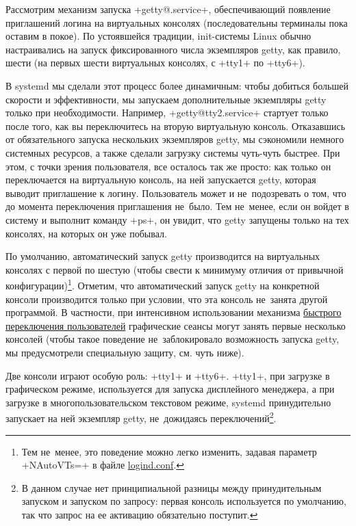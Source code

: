 \documentclass[10pt,oneside,a4paper]{article}
\begin{document}
Рассмотрим механизм запуска +getty@.service+, обеспечивающий появление
приглашений логина на виртуальных консолях (последовательны терминалы пока
оставим в покое). По устоявшейся традиции, init-системы Linux обычно
настраивались на запуск фиксированного числа экземпляров getty, как правило,
шести (на первых шести виртуальных консолях, с +tty1+ по +tty6+).

В systemd мы сделали этот процесс более динамичным: чтобы добиться большей
скорости и эффективности, мы запускаем дополнительные экземпляры getty только
при необходимости. Например, +getty@tty2.service+ стартует только после того,
как вы переключитесь на вторую виртуальную консоль. Отказавшись от
обязательного запуска нескольких экземпляров getty, мы сэкономили немного
системных ресурсов, а также сделали загрузку системы чуть-чуть быстрее. При
этом, с точки зрения пользователя, все осталось так же просто: как только он
переключается на виртуальную консоль, на ней запускается getty, которая выводит
приглашение к логину. Пользователь может и не~подозревать о том, что до момента
переключения приглашения не~было. Тем не~менее, если он войдет в систему и
выполнит команду +ps+, он увидит, что getty запущены только на тех консолях, на
которых он уже побывал.

По умолчанию, автоматический запуск getty производится на виртуальных консолях с
первой по шестую (чтобы свести к минимуму отличия от привычной
конфигурации)\footnote{Тем не~менее, это поведение можно легко изменить,
задавая параметр +NAutoVTs=+ в файле
\href{http://www.freedesktop.org/software/systemd/man/logind.conf.html}{logind.conf}.}.
Отметим, что автоматический запуск getty на конкретной консоли производится
только при условии, что эта консоль не~занята другой программой. В частности,
при интенсивном использовании механизма
\href{https://en.wikipedia.org/wiki/Fast_user_switching}{быстрого переключения
пользователей} графические сеансы могут занять первые несколько консолей (чтобы
такое поведение не~заблокировало возможность запуска getty, мы предусмотрели
специальную защиту, см. чуть ниже).

Две консоли играют особую роль: +tty1+ и +tty6+. +tty1+, при загрузке в
графическом режиме, используется для запуска дисплейного менеджера, а при
загрузке в многопользовательском текстовом режиме, systemd принудительно
запускает на ней экземпляр getty, не~дожидаясь переключений\footnote{В данном
случае нет принципиальной разницы между принудительным запуском и запуском по
запросу: первая консоль используется по умолчанию, так что запрос на ее
активацию обязательно поступит.}.
\end{document}
